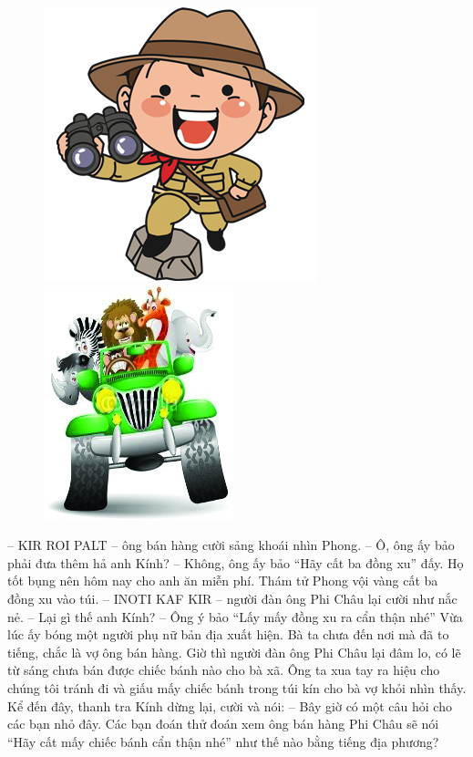 		\begin{figure}[H]
			\centering
			\vspace*{-5pt}
			\captionsetup{labelformat= empty, justification=centering}
			\includegraphics[height=0.4\linewidth]{1}\quad
			\includegraphics[height=0.4\linewidth]{2}
			\vspace*{-15pt}
		\end{figure}
	-- KIR ROI PALT -- ông bán hàng cười sảng khoái nhìn Phong. 
	\vskip 0.1cm
	-- Ô, ông ấy bảo phải đưa thêm hả anh Kính? 
	\vskip 0.1cm
	-- Không, ông ấy bảo “Hãy cất ba đồng xu” đấy. Họ tốt bụng nên hôm nay cho anh ăn miễn phí.
	\vskip 0.1cm 
	Thám tử Phong vội vàng cất ba đồng xu vào túi. 
	\vskip 0.1cm
	-- INOTI KAF KIR -- người đàn ông Phi Châu lại cười như nắc nẻ. 
	\vskip 0.1cm
	-- Lại gì thế anh Kính?
	\vskip 0.1cm
	-- Ông ý bảo “Lấy mấy đồng xu ra cẩn thận nhé” 
	\vskip 0.1cm
	Vừa lúc ấy bóng một người phụ nữ bản địa xuất hiện. Bà ta chưa đến nơi mà đã to tiếng, chắc là vợ ông bán hàng. Giờ thì người đàn ông Phi Châu lại đâm lo, có lẽ từ sáng chưa bán được chiếc bánh nào cho bà xã. Ông ta xua tay ra hiệu cho chúng tôi tránh đi và giấu mấy chiếc bánh trong túi kín cho bà vợ khỏi nhìn thấy. 
	\vskip 0.1cm
	Kể đến đây, thanh tra Kính dừng lại, cười và nói:
	\vskip 0.1cm
	--	Bây giờ có một câu hỏi cho các bạn nhỏ đây. Các bạn đoán thử đoán xem ông bán hàng Phi Châu sẽ nói “Hãy cất mấy chiếc bánh cẩn thận nhé” như thế nào bằng tiếng địa phương? 
